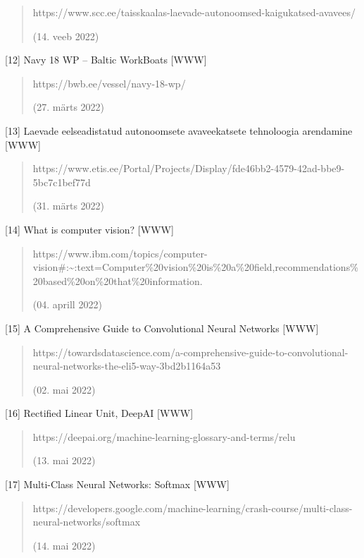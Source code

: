\documentclass[12pt,a4paper]{report}
\begin{document}
\begin{quote}
https://www.scc.ee/taisskaalas-laevade-autonoomsed-kaigukatsed-avavees/

(14. veeb 2022)
\end{quote}

{[}12{]} Navy 18 WP -- Baltic WorkBoats {[}WWW{]}

\begin{quote}
https://bwb.ee/vessel/navy-18-wp/

(27. märts 2022)
\end{quote}

{[}13{]} Laevade eelseadistatud autonoomsete avaveekatsete tehnoloogia arendamine {[}WWW{]}

\begin{quote}
https://www.etis.ee/Portal/Projects/Display/fde46bb2-4579-42ad-bbe9-5bc7c1bef77d

(31. märts 2022)
\end{quote}

{[}14{]} What is computer vision? {[}WWW{]}

\begin{quote}
https://www.ibm.com/topics/computer-vision\#:\textasciitilde:text=Computer\%20vision\%20is\%20a\%20field,recommendations\%20based\%20on\%20that\%20information.

(04. aprill 2022)
\end{quote}

{[}15{]} A Comprehensive Guide to Convolutional Neural Networks {[}WWW{]}

\begin{quote}
https://towardsdatascience.com/a-comprehensive-guide-to-convolutional-neural-networks-the-eli5-way-3bd2b1164a53

(02. mai 2022)
\end{quote}

{[}16{]} Rectified Linear Unit, DeepAI {[}WWW{]}

\begin{quote}
https://deepai.org/machine-learning-glossary-and-terms/relu

(13. mai 2022)
\end{quote}

{[}17{]} Multi-Class Neural Networks: Softmax {[}WWW{]}

\begin{quote}
https://developers.google.com/machine-learning/crash-course/multi-class-neural-networks/softmax

(14. mai 2022)
\end{quote}
\end{document}
